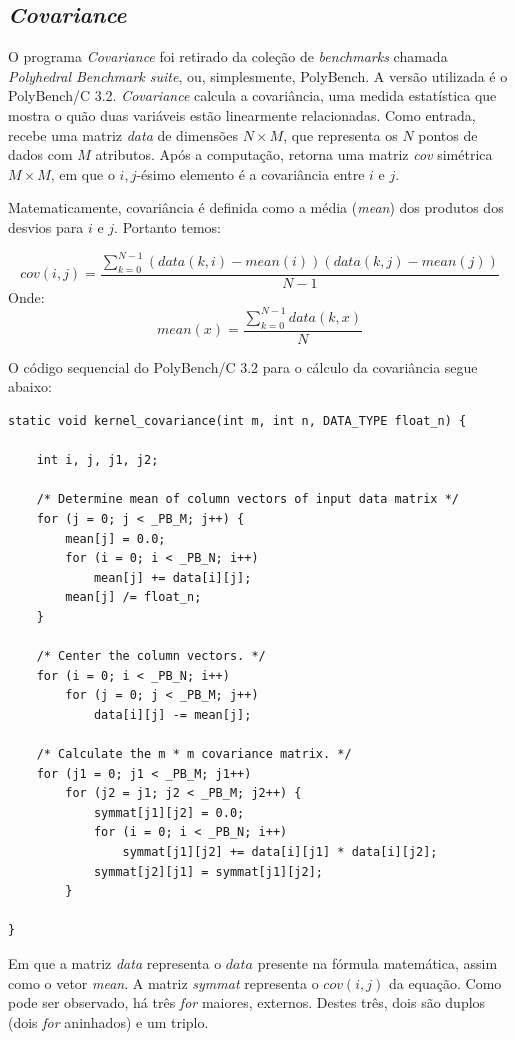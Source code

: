 \documentclass[12pt]{article}
\begin{document}
\subsection{\textit{Covariance}}

O programa \textit{Covariance} foi retirado da coleção de \textit{benchmarks} chamada \textit{Polyhedral Benchmark suite}, ou, simplesmente, PolyBench. A versão utilizada é o PolyBench/C 3.2. \textit{Covariance} calcula a covariância, uma medida estatística que mostra o quão duas variáveis estão linearmente relacionadas. Como entrada, recebe uma matriz \textit{data} de dimensões $N \times M$, que representa os $N$ pontos de dados com $M$ atributos. Após a computação, retorna uma matriz \textit{cov} simétrica $M \times M$, em que o $i,j$-ésimo elemento é a covariância entre $i$ e $j$. 

Matematicamente, covariância é definida como a média (\textit{mean}) dos produtos dos desvios para $i$ e $j$. Portanto temos:

$$ cov\left(i,j\right)=\frac{\sum_{k=0}^{N-1} \left(data\left(k,i\right)-mean\left(i\right)\right)\left(data\left(k,j\right)-mean\left(j\right)\right)}{N-1}
$$
Onde:
$$ mean\left(x\right)=\frac{\sum_{k=0}^{N-1} data\left(k,x\right)}{N}
$$

O código sequencial do PolyBench/C 3.2 para o cálculo da covariância segue abaixo:

{\scriptsize
\begin{lstlisting}
static void kernel_covariance(int m, int n, DATA_TYPE float_n) {

	int i, j, j1, j2;
	
	/* Determine mean of column vectors of input data matrix */
	for (j = 0; j < _PB_M; j++) {
		mean[j] = 0.0;
		for (i = 0; i < _PB_N; i++)
			mean[j] += data[i][j];
		mean[j] /= float_n;
	}
	
	/* Center the column vectors. */
	for (i = 0; i < _PB_N; i++)
		for (j = 0; j < _PB_M; j++)
			data[i][j] -= mean[j];
	
	/* Calculate the m * m covariance matrix. */
	for (j1 = 0; j1 < _PB_M; j1++)
		for (j2 = j1; j2 < _PB_M; j2++) {
			symmat[j1][j2] = 0.0;
			for (i = 0; i < _PB_N; i++)
				symmat[j1][j2] += data[i][j1] * data[i][j2];
			symmat[j2][j1] = symmat[j1][j2];
		}
	
}
\end{lstlisting}}

Em que a matriz \textit{data} representa o $data$ presente na fórmula matemática, assim como o vetor \textit{mean}. A matriz \textit{symmat} representa o $cov\left(i,j\right)$ da equação. Como pode ser observado, há três \textit{for} maiores, externos. Destes três, dois são duplos (dois \textit{for} aninhados) e um triplo. 
\end{document}
